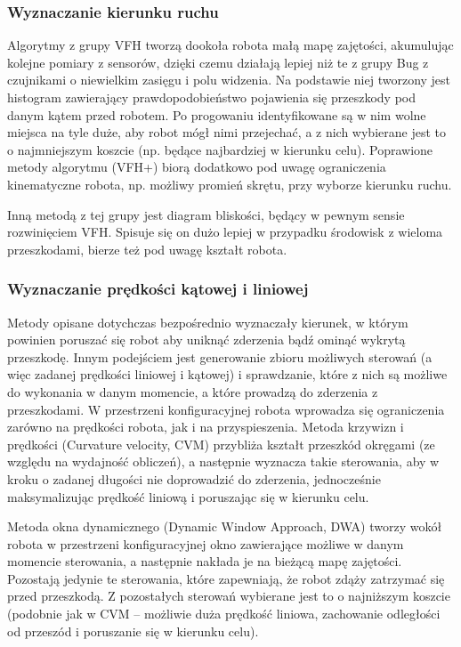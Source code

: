 \subsubsection{Wyznaczanie kierunku ruchu}

Algorytmy z grupy VFH tworzą dookoła robota małą mapę zajętości, akumulując kolejne
pomiary z sensorów, dzięki czemu działają lepiej niż te z grupy Bug z czujnikami
o niewielkim zasięgu i polu widzenia. Na podstawie niej tworzony jest histogram
zawierający prawdopodobieństwo pojawienia się przeszkody pod danym kątem przed robotem.
Po progowaniu identyfikowane są w nim wolne miejsca na tyle duże, aby robot mógł
nimi przejechać, a z nich wybierane jest to o najmniejszym koszcie (np. będące najbardziej
w kierunku celu). Poprawione metody algorytmu (VFH+) biorą dodatkowo pod uwagę
ograniczenia kinematyczne robota, np. możliwy promień skrętu, przy wyborze kierunku ruchu.

Inną metodą z tej grupy jest diagram bliskości, będący w pewnym sensie rozwinięciem VFH.
Spisuje się on dużo lepiej w przypadku środowisk z wieloma przeszkodami, bierze też
pod uwagę kształt robota.

\subsubsection{Wyznaczanie prędkości kątowej i liniowej}

Metody opisane dotychczas bezpośrednio wyznaczały kierunek, w którym powinien poruszać
się robot aby uniknąć zderzenia bądź ominąć wykrytą przeszkodę. Innym podejściem
jest generowanie zbioru możliwych sterowań (a więc zadanej prędkości liniowej i kątowej)
i sprawdzanie, które z nich są możliwe do wykonania w danym momencie, a które prowadzą
do zderzenia z przeszkodami. W przestrzeni konfiguracyjnej robota wprowadza się ograniczenia
zarówno na prędkości robota, jak i na przyspieszenia. Metoda krzywizn i prędkości
(Curvature velocity, CVM) przybliża kształt przeszkód okręgami (ze względu na wydajność
obliczeń), a następnie wyznacza takie sterowania, aby w kroku o zadanej długości
nie doprowadzić do zderzenia, jednocześnie maksymalizując prędkość liniową i poruszając
się w kierunku celu.

Metoda okna dynamicznego (Dynamic Window Approach, DWA) tworzy wokół robota w przestrzeni
konfiguracyjnej okno zawierające możliwe w danym momencie sterowania, a następnie nakłada
je na bieżącą mapę zajętości. Pozostają jedynie te sterowania, które zapewniają,
że robot zdąży zatrzymać się przed przeszkodą. Z pozostałych sterowań wybierane jest
to o najniższym koszcie (podobnie jak w CVM -- możliwie duża prędkość liniowa,
zachowanie odległości od przeszód i poruszanie się w kierunku celu).
